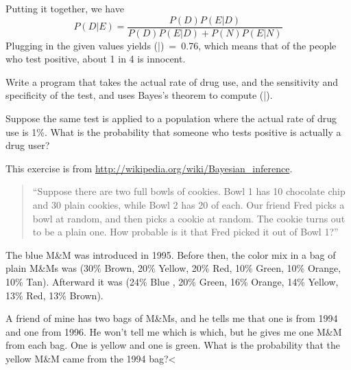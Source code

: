 \documentclass[12pt]{book}
\begin{document}
Putting it together, we have
%
\[ P(D|E) = \frac{P(D) P(E|D)}{P(D) P(E|D) + P(N) P(E|N)}\]
%
Plugging in the given values yields \Prob(\D|\E)~=~0.76, which means
that of the people who test positive, about 1 in 4 is innocent. 

\begin{exercise}
Write a program that takes the actual rate of drug use, and the
sensitivity and specificity of the test, and uses Bayes's theorem
to compute \Prob(\D|\E).

Suppose the same test is applied to a population where the actual
rate of drug use is 1\%.  What is the probability that someone
who tests positive is actually a drug user?

\end{exercise}


\begin{exercise}
This exercise is from \url{http://wikipedia.org/wiki/Bayesian_inference}.

\begin{quote}

``Suppose there are two full bowls of cookies. Bowl 1 has 10 chocolate
  chip and 30 plain cookies, while Bowl 2 has 20 of each. Our friend
  Fred picks a bowl at random, and then picks a cookie at random. The
  cookie turns out to be a plain one. How probable is it that Fred
  picked it out of Bowl 1?''

\end{quote}

\end{exercise}

\begin{exercise}

The blue M\&M was introduced in 1995.  Before then, the color mix in
a bag of plain M\&Ms was (30\% Brown, 20\% Yellow, 20\% Red, 10\%
Green, 10\% Orange, 10\% Tan).  Afterward it was (24\% Blue , 20\%
Green, 16\% Orange, 14\% Yellow, 13\% Red, 13\% Brown).


A friend of mine has two bags of M\&Ms, and he tells me
that one is from 1994 and one from 1996.  He won't tell me which is
which, but he gives me one M\&M from each bag.  One is yellow and
one is green.  What is the probability that the yellow M\&M came
from the 1994 bag?<
  
\end{exercise}
\end{document}
